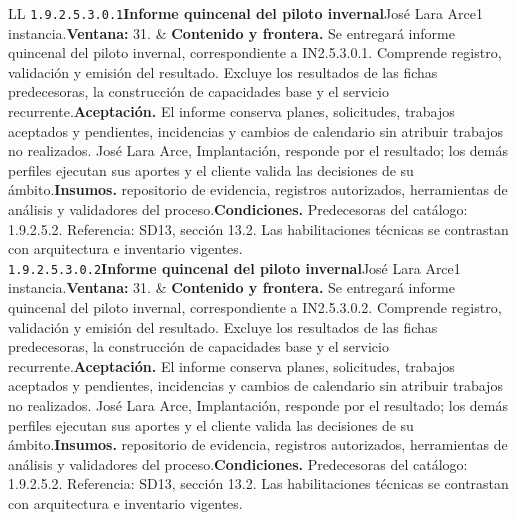 \begin{longtable}{L{\tabcolsep\relax}L{\tabcolsep\relax}}
\texttt{1.\allowbreak{}9.\allowbreak{}2.\allowbreak{}5.\allowbreak{}3.\allowbreak{}0.\allowbreak{}1}\newline{}\textbf{Informe quincenal del piloto invernal}\newline{}José Lara Arce\newline{}1 instancia.\newline{}\textbf{Ventana:} 31. & \textbf{Contenido y frontera.} Se entregará informe quincenal del piloto invernal, correspondiente a IN2.5.3.0.1. Comprende registro, validación y emisión del resultado. Excluye los resultados de las fichas predecesoras, la construcción de capacidades base y el servicio recurrente.\newline{}\textbf{Aceptación.} El informe conserva planes, solicitudes, trabajos aceptados y pendientes, incidencias y cambios de calendario sin atribuir trabajos no realizados. José Lara Arce, Implantación, responde por el resultado; los demás perfiles ejecutan sus aportes y el cliente valida las decisiones de su ámbito.\newline{}\textbf{Insumos.} repositorio de evidencia, registros autorizados, herramientas de análisis y validadores del proceso.\newline{}\textbf{Condiciones.} Predecesoras del catálogo: 1.9.2.5.2. Referencia: SD13, sección 13.2. Las habilitaciones técnicas se contrastan con arquitectura e inventario vigentes.\\\hline
\texttt{1.\allowbreak{}9.\allowbreak{}2.\allowbreak{}5.\allowbreak{}3.\allowbreak{}0.\allowbreak{}2}\newline{}\textbf{Informe quincenal del piloto invernal}\newline{}José Lara Arce\newline{}1 instancia.\newline{}\textbf{Ventana:} 31. & \textbf{Contenido y frontera.} Se entregará informe quincenal del piloto invernal, correspondiente a IN2.5.3.0.2. Comprende registro, validación y emisión del resultado. Excluye los resultados de las fichas predecesoras, la construcción de capacidades base y el servicio recurrente.\newline{}\textbf{Aceptación.} El informe conserva planes, solicitudes, trabajos aceptados y pendientes, incidencias y cambios de calendario sin atribuir trabajos no realizados. José Lara Arce, Implantación, responde por el resultado; los demás perfiles ejecutan sus aportes y el cliente valida las decisiones de su ámbito.\newline{}\textbf{Insumos.} repositorio de evidencia, registros autorizados, herramientas de análisis y validadores del proceso.\newline{}\textbf{Condiciones.} Predecesoras del catálogo: 1.9.2.5.2. Referencia: SD13, sección 13.2. Las habilitaciones técnicas se contrastan con arquitectura e inventario vigentes.\\\hline

\end{longtable}

